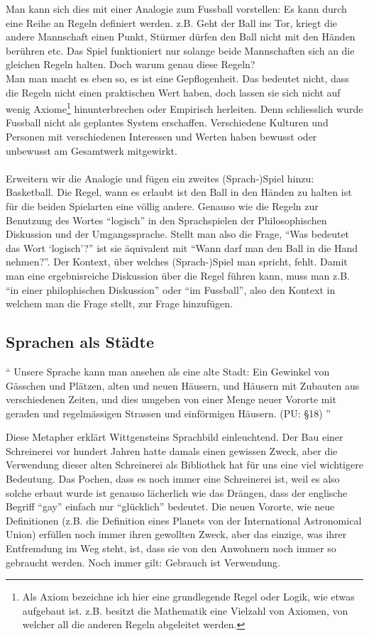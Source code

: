 \documentclass[10pt,a4paper]{article}
\begin{document}
Man kann sich dies mit einer Analogie zum Fussball vorstellen: Es kann durch eine Reihe an Regeln definiert werden. z.B. Geht der Ball ins Tor, kriegt die andere Mannschaft einen Punkt, Stürmer dürfen den Ball nicht mit den Händen berühren etc. Das Spiel funktioniert nur solange beide Mannschaften sich an die gleichen Regeln halten. Doch warum genau diese Regeln? \\ Man man macht es eben so, es ist eine Gepflogenheit. Das bedeutet nicht, dass die Regeln nicht einen praktischen Wert haben, doch lassen sie sich nicht auf wenig Axiome\footnote{Als Axiom bezeichne ich hier eine grundlegende Regel oder Logik, wie etwas aufgebaut ist. z.B. besitzt die Mathematik eine Vielzahl von Axiomen, von welcher all die anderen Regeln abgeleitet werden.} hinunterbrechen oder Empirisch herleiten. Denn schliesslich wurde Fussball nicht als geplantes System erschaffen. Verschiedene Kulturen und Personen mit verschiedenen Interessen und Werten haben bewusst oder unbewusst am Gesamtwerk mitgewirkt. \\
\\
Erweitern wir die Analogie und fügen ein zweites (Sprach-)Spiel hinzu: Basketball. Die Regel, wann es erlaubt ist den Ball in den Händen zu halten ist für die beiden Spielarten eine völlig andere. Genauso wie die Regeln zur Benutzung des Wortes \enquote{logisch} in den Sprachspielen der Philosophischen Diskussion und der Umgangssprache. Stellt man also die Frage, \enquote{Was bedeutet das Wort \enquote{logisch}?} ist sie äquivalent mit \enquote{Wann darf man den Ball in die Hand nehmen?}. Der Kontext, über welches (Sprach-)Spiel man spricht, fehlt. Damit man eine ergebnisreiche Diskussion über die Regel führen kann, muss man z.B. \enquote{in einer philophischen Diskussion} oder \enquote{im Fussball}, also den Kontext in welchem man die Frage stellt, zur Frage hinzufügen.

\subsection{Sprachen als Städte}
\begin{displayquote}
\enquote{
Unsere Sprache kann man ansehen als eine alte Stadt: Ein Gewinkel von Gässchen und Plätzen, alten und neuen Häusern, und Häusern mit Zubauten aus verschiedenen Zeiten, und dies umgeben von einer Menge neuer Vororte mit geraden und regelmässigen Strassen und einförmigen Häusern. (PU: §18)
}
\end{displayquote}
Diese Metapher erklärt Wittgensteins Sprachbild einleuchtend. Der Bau einer Schreinerei vor hundert Jahren hatte damals einen gewissen Zweck, aber die Verwendung dieser alten Schreinerei als Bibliothek hat für uns eine viel wichtigere Bedeutung. Das Pochen, dass es noch immer eine Schreinerei ist, weil es also solche erbaut wurde ist genauso lächerlich wie das Drängen, dass der englische Begriff \enquote{gay} einfach nur \enquote{glücklich} bedeutet. Die neuen Vororte, wie neue Definitionen (z.B. die Definition eines Planets von der International Astronomical Union) erfüllen noch immer ihren gewollten Zweck, aber das einzige, was ihrer Entfremdung im Weg steht, ist, dass sie von den Anwohnern noch immer so gebraucht werden. Noch immer gilt: Gebrauch ist Verwendung.
\end{document}
